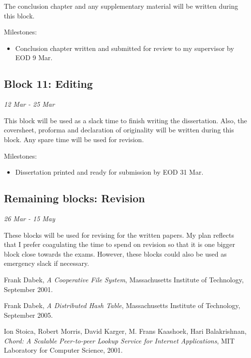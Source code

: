 \documentclass[12pt]{article}
\begin{document}
The conclusion chapter and any supplementary material will be written during this block.

Milestones:
\begin{itemize}
\item{Conclusion chapter written and submitted for review to my supervisor by EOD 9 Mar.}

\end{itemize}

\subsection{Block 11: Editing}
\emph{12 Mar - 25 Mar} %

This block will be used as a slack time to finish writing the dissertation. Also, the coversheet, proforma and declaration of originality will be written during this block. Any spare time will be used for revision.

Milestones:
\begin{itemize}
\item{Dissertation printed and ready for submission by EOD 31 Mar.}
\end{itemize}

\subsection{Remaining blocks: Revision}
\emph{26 Mar - 15 May}  %

These blocks will be used for revising for the written papers. My plan reflects that I prefer coagulating the time to spend on revision so that it is one bigger block close towards the exams. However, these blocks could also be used as emergency slack if necessary.

\clearpage
\begin{thebibliography}{9}

  Frank Dabek,
  \emph{A Cooperative File System},
  Massachusetts Institute of Technology,
  September 2001.

  Frank Dabek,
  \emph{A Distributed Hash Table},
  Massachusetts Institute of Technology,
  September 2005.

  Ion Stoica, Robert Morris, David Karger, M. Frans Kaashoek, Hari Balakrishnan,
  \emph{Chord: A Scalable Peer-to-peer Lookup Service for Internet Applications},
  MIT Laboratory for Computer Science,
  2001.

\end{thebibliography}
\end{document}
